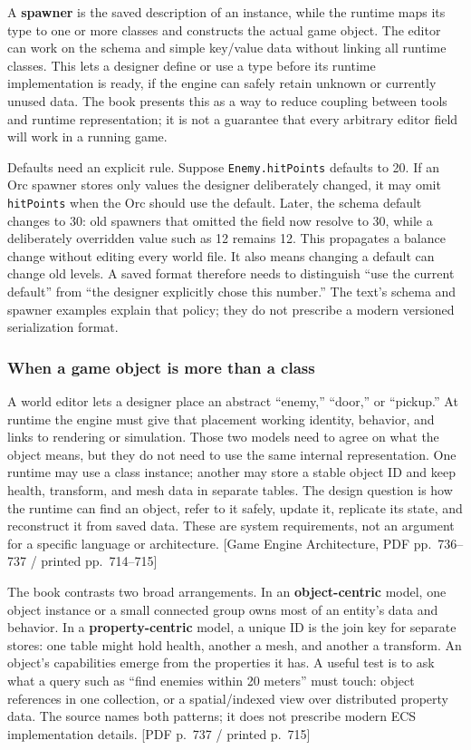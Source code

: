 A \textbf{spawner} is the saved description of an instance, while the runtime maps its type to one or more classes and constructs the actual game object. The editor can work on the schema and simple key/value data without linking all runtime classes. This lets a designer define or use a type before its runtime implementation is ready, if the engine can safely retain unknown or currently unused data. The book presents this as a way to reduce coupling between tools and runtime representation; it is not a guarantee that every arbitrary editor field will work in a running game.

Defaults need an explicit rule. Suppose \texttt{Enemy.hitPoints} defaults to 20. If an Orc spawner stores only values the designer deliberately changed, it may omit \texttt{hitPoints} when the Orc should use the default. Later, the schema default changes to 30: old spawners that omitted the field now resolve to 30, while a deliberately overridden value such as 12 remains 12. This propagates a balance change without editing every world file. It also means changing a default can change old levels. A saved format therefore needs to distinguish ``use the current default'' from ``the designer explicitly chose this number.'' The text's schema and spawner examples explain that policy; they do not prescribe a modern versioned serialization format.

\subsubsection{When a game object is more than a class}\label{06-engine-ii-ch032-when-a-game-object-is-more-than-a-class}

A world editor lets a designer place an abstract ``enemy,'' ``door,'' or ``pickup.'' At runtime the engine must give that placement working identity, behavior, and links to rendering or simulation. Those two models need to agree on what the object means, but they do not need to use the same internal representation. One runtime may use a class instance; another may store a stable object ID and keep health, transform, and mesh data in separate tables. The design question is how the runtime can find an object, refer to it safely, update it, replicate its state, and reconstruct it from saved data. These are system requirements, not an argument for a specific language or architecture. {[}Game Engine Architecture, PDF pp.~736--737 / printed pp.~714--715{]}

The book contrasts two broad arrangements. In an \textbf{object-centric} model, one object instance or a small connected group owns most of an entity's data and behavior. In a \textbf{property-centric} model, a unique ID is the join key for separate stores: one table might hold health, another a mesh, and another a transform. An object's capabilities emerge from the properties it has. A useful test is to ask what a query such as ``find enemies within 20 meters'' must touch: object references in one collection, or a spatial/indexed view over distributed property data. The source names both patterns; it does not prescribe modern ECS implementation details. {[}PDF p.~737 / printed p.~715{]}

